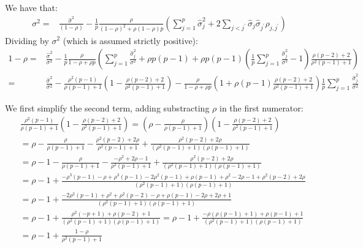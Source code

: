\documentclass[12pt]{article}
\begin{document}
We have that:
\begin{align*}
\sigma^2 =& \frac{\widehat{\sigma}^2}{(1- \rho)}  - \frac{1}{p}\frac{\rho}{(1-\rho)^2+\rho(1-\rho)p} \left(\sum_{j=1}^p \widehat{\sigma}^2_j + 2\sum_{j < j^{\prime}}\widehat{\sigma}_j \widehat{\sigma}_{j^{\prime}}\widehat{\rho}_{j,j^{\prime}}\right)
\end{align*}
Dividing by \(\sigma^2\) (which is assumed strictly positive):
\begin{align*}
1- \rho =& \frac{\widehat{\sigma}^2}{\sigma^2}  - \frac{1}{p}\frac{\rho}{1-\rho+\rho p} \left(\sum_{j=1}^p \frac{\widehat{\sigma}^2_j}{\sigma^2} + \rho p (p-1) + \rho p (p-1) \left(\frac{1}{p}\sum_{j=1}^p \frac{\widehat{\sigma}^2_j}{\sigma^2} - 1\right) \frac{\rho(p-2)  + 2}{\rho^2(p-1) + 1}\right) \\
 =& \frac{\widehat{\sigma}^2}{\sigma^2}  - \frac{\rho^2(p-1)}{\rho(p-1)+1} \left(1 - \frac{\rho(p-2)  + 2}{\rho^2(p-1) + 1} \right) - \frac{\rho}{1-\rho+\rho p} \left(1 + \rho (p-1) \frac{\rho(p-2)  + 2}{\rho^2(p-1) + 1} \right) \frac{1}{p} \sum_{j=1}^p \frac{\widehat{\sigma}^2_j}{\sigma^2} 
\end{align*}


We first simplify the second term, adding substracting \(\rho\) in the first numerator:
\begin{align*}
& \frac{\rho^2(p-1)}{\rho(p-1)+1} \left(1 - \frac{\rho(p-2)  + 2}{\rho^2(p-1) + 1} \right)
=  \left(\rho - \frac{\rho}{\rho(p-1)+1}\right)\left(1 - \frac{\rho(p-2)  + 2}{\rho^2(p-1) + 1} \right) \\
&=  \rho - \frac{\rho}{\rho(p-1)+1} -  \frac{\rho^2(p-2)  + 2\rho}{\rho^2(p-1) + 1} +  \frac{\rho^2(p-2)  + 2\rho}{(\rho^2(p-1) + 1)(\rho(p-1)+1)} \\
&=  \rho - 1 - \frac{\rho}{\rho(p-1)+1} -  \frac{-\rho^2 + 2\rho - 1}{\rho^2(p-1) + 1} +  \frac{\rho^2(p-2)  + 2\rho}{(\rho^2(p-1) + 1)(\rho(p-1)+1)}  \\
&=  \rho - 1 + \frac{- \rho^3 (p-1) - \rho + \rho^3(p-1) - 2\rho^2(p-1)+\rho(p-1)+\rho^2-2\rho-1 + \rho^2(p-2)  + 2\rho}{(\rho^2(p-1) + 1)(\rho(p-1)+1)}  \\
&=  \rho - 1 + \frac{-2\rho^2(p-1)+\rho^2 + \rho^2(p-2)- \rho +\rho(p-1)-2\rho  + 2\rho +1 }{(\rho^2(p-1) + 1)(\rho(p-1)+1)}  \\
&=  \rho - 1 + \frac{\rho^2(-p+1) + \rho(p-2) +1 }{(\rho^2(p-1) + 1)(\rho(p-1)+1)} =  \rho - 1 + \frac{-\rho(\rho (p-1) +1) + \rho(p-1) +1 }{(\rho^2(p-1) + 1)(\rho(p-1)+1)} \\
&=  \rho - 1 + \frac{1-\rho}{\rho^2(p-1) + 1} 
\end{align*}
\end{document}
